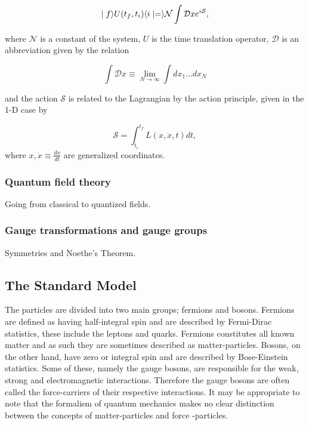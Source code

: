 \begin{equation}
	\mid f \rangle U(t_f,t_i) \langle i \mid = \rangle \mathcal{N} \int \mathcal{D}x e^{i\mathcal{S}},
\end{equation}

where $\mathcal{N}$ is a constant of the system, $U$ is the time translation operator, $\mathcal{D}$ is an abbreviation given by the relation 

\begin{equation}
	\int \mathcal{D} x \equiv \lim_{N \to \infty} \int dx_1 \dots dx_N
\end{equation}

and the action $\mathcal{S}$ is related to the Lagrangian by the action principle, given in the 1-D case by

\begin{equation}
	\mathcal{S} = \int_{t_i}^{t_f} L(x,\dot{x},t)dt,
\end{equation}
where $x, \dot{x} \equiv \frac{dx}{dt}$ are generalized coordinates.

\subsubsection{Quantum field theory}
Going from classical to quantized fields.

\subsubsection{Gauge transformations and gauge groups}
Symmetries and Noethe's Theorem.

\subsection{The Standard Model}

The particles are divided into two main groups; fermions and bosons. Fermions are defined as having half-integral spin and are described by Fermi-Dirac statistics, these include the leptons and quarks. Fermions constitutes all known matter and as such they are sometimes described as matter-particles. Bosons, on the other hand, have zero or integral spin and are described by Bose-Einstein statistics. Some of these, namely the gauge bosons, are responsible for the weak, strong and electromagnetic interactions. Therefore the gauge bosons are often called the force-carriers of their respective interactions. It may be appropriate to note that the formalism of quantum mechanics makes no clear distinction between the concepts of matter-particles and force -particles.

